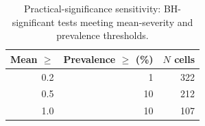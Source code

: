 \begin{table}[htbp]
    \centering
    \caption{Practical-significance sensitivity: BH-significant tests meeting mean-severity and prevalence thresholds.}
    \label{tab:practical_sig}
    \begin{tabular}{rrr}
        \toprule
        Mean $\ge$ & Prevalence $\ge$ (\%) & $N$ cells \\
        \midrule
        0.2 & 1 & 322 \\
        0.5 & 10 & 212 \\
        1.0 & 10 & 107 \\
        \bottomrule
    \end{tabular}
\end{table}
